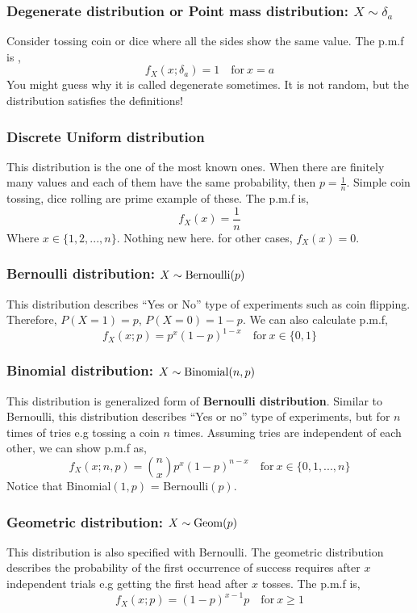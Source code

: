 \subsubsection{Degenerate distribution or Point mass distribution: $X \sim \delta_a$}
Consider tossing coin or dice where all the sides show the same value. The p.m.f is ,
\[f_X(x; \delta_a) = 1 \quad \text{for} \ x = a\]
You might guess why it is called degenerate sometimes. It is not random, but the distribution satisfies the definitions!
\subsubsection{Discrete Uniform distribution}
This distribution is the one of the most known ones. When there are finitely many values and each of them have the same probability, then $p = \frac{1}{n}$. Simple coin tossing, dice rolling are prime example of these. The p.m.f is,
\[f_X(x) = \frac{1}{n}\]
Where $x \in \{1,2,...,n \}$. Nothing new here.
for other cases, $f_X(x) = 0$. 
\subsubsection*{Bernoulli distribution: $X \sim \operatorname{Bernoulli}(p)$ }
This distribution describes ``Yes or No'' type of experiments such as coin flipping. Therefore, $P(X = 1) = p$, $P(X = 0) = 1-p$. We can also calculate p.m.f,
\[f_X(x; p) = p^x(1-p)^{1-x} \quad \text{for} \ x \in \{0,1\}\]

\subsubsection*{Binomial distribution:  $ X \sim \operatorname{Binomial}(n,p)$}
This distribution is generalized form of \textbf{Bernoulli distribution}. Similar to Bernoulli, this distribution describes ``Yes or no'' type of experiments, but for $n$ times of tries e.g tossing a coin $n$ times. Assuming tries are independent of each other, we can show p.m.f as,
\[f_X(x; n,p) = \binom{n}{x}p^x(1-p)^{n-x} \quad \text{for} \ x \in \{0,1,...,n\}\]
Notice that Binomial$(1,p)$ = Bernoulli$(p)$.
\subsubsection*{Geometric distribution: $X \sim \operatorname{Geom}(p)$}
This distribution is also specified with Bernoulli. The geometric distribution describes the probability of the first occurrence of success requires after $x$ independent trials e.g getting the first head after $x$ tosses. The p.m.f is,
\[ f_{X}(x; p) = (1-p)^{x-1}p \quad \text{for} \ x \ge 1 \]
